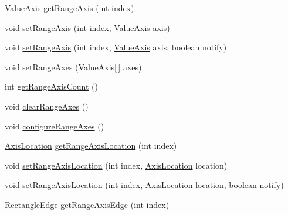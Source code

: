 \begin{DoxyCompactItemize}
\item 
\mbox{\hyperlink{classorg_1_1jfree_1_1chart_1_1axis_1_1_value_axis}{Value\+Axis}} \mbox{\hyperlink{classorg_1_1jfree_1_1chart_1_1plot_1_1_x_y_plot_a7da52aa2199931e72806da92b56e4dc2}{get\+Range\+Axis}} (int index)
\item 
void \mbox{\hyperlink{classorg_1_1jfree_1_1chart_1_1plot_1_1_x_y_plot_adf8ca4d952a2871070c70d1dca674ec6}{set\+Range\+Axis}} (int index, \mbox{\hyperlink{classorg_1_1jfree_1_1chart_1_1axis_1_1_value_axis}{Value\+Axis}} axis)
\item 
void \mbox{\hyperlink{classorg_1_1jfree_1_1chart_1_1plot_1_1_x_y_plot_ad92eb0361fcb87f079eecb62a3c35ae6}{set\+Range\+Axis}} (int index, \mbox{\hyperlink{classorg_1_1jfree_1_1chart_1_1axis_1_1_value_axis}{Value\+Axis}} axis, boolean notify)
\item 
void \mbox{\hyperlink{classorg_1_1jfree_1_1chart_1_1plot_1_1_x_y_plot_a37fecbfc1de0d02d1785b80afc96b5e2}{set\+Range\+Axes}} (\mbox{\hyperlink{classorg_1_1jfree_1_1chart_1_1axis_1_1_value_axis}{Value\+Axis}}\mbox{[}$\,$\mbox{]} axes)
\item 
int \mbox{\hyperlink{classorg_1_1jfree_1_1chart_1_1plot_1_1_x_y_plot_aa5e28a20e931bcf9df88489edad70aa5}{get\+Range\+Axis\+Count}} ()
\item 
void \mbox{\hyperlink{classorg_1_1jfree_1_1chart_1_1plot_1_1_x_y_plot_a5b2614cb3856efb052f6d4cf3b04ec13}{clear\+Range\+Axes}} ()
\item 
void \mbox{\hyperlink{classorg_1_1jfree_1_1chart_1_1plot_1_1_x_y_plot_a4b6a0d47c950a1ed93304a5fb89508dc}{configure\+Range\+Axes}} ()
\item 
\mbox{\hyperlink{classorg_1_1jfree_1_1chart_1_1axis_1_1_axis_location}{Axis\+Location}} \mbox{\hyperlink{classorg_1_1jfree_1_1chart_1_1plot_1_1_x_y_plot_a8e34e93de05b6fff6f0af0bef7b285d7}{get\+Range\+Axis\+Location}} (int index)
\item 
void \mbox{\hyperlink{classorg_1_1jfree_1_1chart_1_1plot_1_1_x_y_plot_a7421dcb0efb6a256b010db43c4260d88}{set\+Range\+Axis\+Location}} (int index, \mbox{\hyperlink{classorg_1_1jfree_1_1chart_1_1axis_1_1_axis_location}{Axis\+Location}} location)
\item 
void \mbox{\hyperlink{classorg_1_1jfree_1_1chart_1_1plot_1_1_x_y_plot_a8bb9fb9268c90667ea80f87efdce9278}{set\+Range\+Axis\+Location}} (int index, \mbox{\hyperlink{classorg_1_1jfree_1_1chart_1_1axis_1_1_axis_location}{Axis\+Location}} location, boolean notify)
\item 
Rectangle\+Edge \mbox{\hyperlink{classorg_1_1jfree_1_1chart_1_1plot_1_1_x_y_plot_a625b18ac16110da5e9dd366dacbeb529}{get\+Range\+Axis\+Edge}} (int index)

\end{DoxyCompactItemize}
